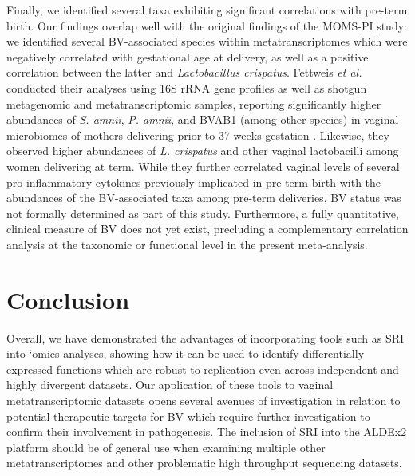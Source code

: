 \documentclass[sn-mathphys,Numbered]{sn-jnl}%
\begin{document}
Finally, we identified several taxa exhibiting significant correlations with pre-term birth. Our findings overlap well with the original findings of the MOMS-PI study: we identified several BV-associated species within metatranscriptomes which were negatively correlated with gestational age at delivery, as well as a positive correlation between the latter and \textit{Lactobacillus crispatus}. Fettweis \textit{et al.} conducted their analyses using 16S rRNA gene profiles as well as shotgun metagenomic and metatranscriptomic samples, reporting significantly higher abundances of \textit{S. amnii}, \textit{P. amnii}, and BVAB1 (among other species) in vaginal microbiomes of mothers delivering prior to 37 weeks gestation \citep{Fettweis:2019aa}. Likewise, they observed higher abundances of \textit{L. crispatus} and other vaginal lactobacilli among women delivering at term. While they further correlated vaginal levels of several pro-inflammatory cytokines previously implicated in pre-term birth with the abundances of the BV-associated taxa among pre-term deliveries, BV status was not formally determined as part of this study. Furthermore, a fully quantitative, clinical measure of BV does not yet exist, precluding a complementary correlation analysis at the taxonomic or functional level in the present meta-analysis.

\section{Conclusion} \label{sec:secConc}

Overall, we have demonstrated the advantages of incorporating tools such as SRI into `omics analyses, showing how it can be used to identify differentially expressed functions which are robust to replication even across independent and highly divergent datasets. Our application of these tools to vaginal metatranscriptomic datasets opens several avenues of investigation in relation to potential therapeutic targets for BV which require further investigation to confirm their involvement in pathogenesis. The inclusion  of SRI into the ALDEx2 platform should be of general use when examining multiple other metatranscriptomes and other problematic high throughput sequencing datasets.

\end{document}
